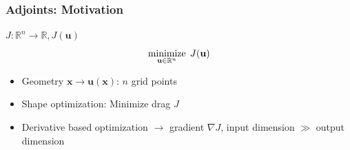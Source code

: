 
\begin{frame}
  \frametitle{Adjoints: Motivation}
  \begin{figure}
    \hspace{1cm}
  \end{figure}
  \begin{center}
    $
    J: \mathbb{R}^n \rightarrow \mathbb{R}, J(\mathbf{u})
    $
    $$
    \minimize_{\mathbf{u} \in \mathbb{R}^n}\;  J(\mathbf{u}) 
    $$
  \end{center}
  \begin{itemize}
    \item Geometry $\mathbf{x} \rightarrow \mathbf{u}(\mathbf{x})$: $n$ grid
      points
    \item Shape optimization: Minimize drag $J$
    \item \alert{Derivative based optimization $\rightarrow$ gradient $\nabla
      J$, input dimension $\gg$ output dimension}
  \end{itemize}
\end{frame}

